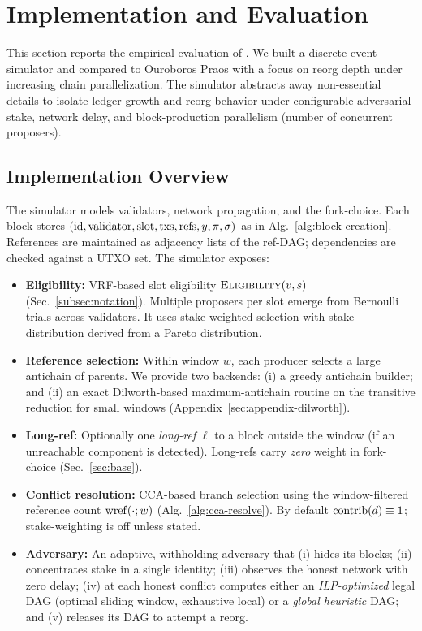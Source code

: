 

\section{Implementation and Evaluation}
\label{sec:eval}
This section reports the empirical evaluation of \ProjBase. We built a discrete-event simulator and compared \ProjBase to Ouroboros Praos with a focus on reorg depth under increasing chain parallelization. The simulator abstracts away non-essential details to isolate ledger growth and reorg behavior under configurable adversarial stake, network delay, and block-production parallelism (number of concurrent proposers).

\vspace{-.3cm}
\subsection{Implementation Overview}
The simulator models validators, network propagation, and the \ProjBase{} fork-choice. Each block stores
$(\mathrm{id},\mathrm{validator},\mathrm{slot},\mathrm{txs},\mathrm{refs},y,\pi,\sigma)$ as in Alg.~\ref{alg:block-creation}. References are maintained as adjacency lists of the ref-DAG; dependencies are checked against a UTXO set.
The simulator exposes:
\begin{itemize}
\item \textbf{Eligibility:} VRF-based slot eligibility $\textsc{Eligibility}(v,s)$ (Sec.~\ref{subsec:notation}). Multiple proposers per slot emerge from Bernoulli trials across validators. It uses stake-weighted selection with stake distribution derived from a Pareto distribution.
\item \textbf{Reference selection:} Within window $w$, each producer selects a large antichain of parents. We provide two backends: (i) a greedy antichain builder; and (ii) an exact Dilworth-based maximum-antichain routine on the transitive reduction for small windows (Appendix~\ref{sec:appendix-dilworth}).
\item \textbf{Long-ref:} Optionally one \emph{long-ref} $\ell$ to a block outside the window (if an unreachable component is detected). Long-refs carry \emph{zero} weight in fork-choice (Sec.~\ref{sec:base}).
\item \textbf{Conflict resolution:} CCA-based branch selection using the window-filtered reference count $\mathrm{wref}(\cdot;w)$ (Alg.~\ref{alg:cca-resolve}). By default $\mathrm{contrib}(d)\equiv 1$; stake-weighting is off unless stated.
\item \textbf{Adversary:} An adaptive, withholding adversary that (i) hides its blocks; (ii) concentrates stake in a single identity; (iii) observes the honest network with zero delay; (iv) at each honest conflict computes either an \emph{ILP-optimized} legal DAG (optimal sliding window, exhaustive local) or a \emph{global heuristic} DAG; and (v) releases its DAG to attempt a reorg.
\end{itemize}

